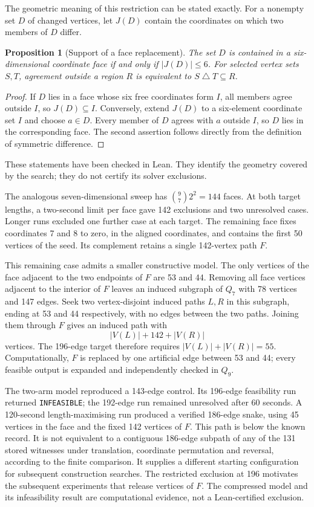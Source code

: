 \documentclass[11pt,a4paper]{article}
\newtheorem{proposition}[theorem]{Proposition}
\theoremstyle{definition}
\theoremstyle{remark}
\begin{document}
The geometric meaning of this restriction can be stated exactly. For a nonempty set $D$ of changed vertices, let $J(D)$ contain the coordinates on which two members of $D$ differ.
\begin{proposition}[Support of a face replacement]
The set $D$ is contained in a six-dimensional coordinate face if and only if $|J(D)|\le6$. For selected vertex sets $S,T$, agreement outside a region $R$ is equivalent to $S\mathbin{\triangle}T\subseteq R$.
\end{proposition}
\begin{proof}
If $D$ lies in a face whose six free coordinates form $I$, all members agree outside $I$, so $J(D)\subseteq I$. Conversely, extend $J(D)$ to a six-element coordinate set $I$ and choose $a\in D$. Every member of $D$ agrees with $a$ outside $I$, so $D$ lies in the corresponding face. The second assertion follows directly from the definition of symmetric difference.
\end{proof}
These statements have been checked in Lean. They identify the geometry covered by the search; they do not certify its solver exclusions.

The analogous seven-dimensional sweep has $\binom97 2^2=144$ faces. At both target lengths, a two-second limit per face gave 142 exclusions and two unresolved cases. Longer runs excluded one further case at each target. The remaining face fixes coordinates 7 and 8 to zero, in the aligned coordinates, and contains the first 50 vertices of the seed. Its complement retains a single 142-vertex path $F$.

This remaining case admits a smaller constructive model. The only vertices of the face adjacent to the two endpoints of $F$ are 53 and 44. Removing all face vertices adjacent to the interior of $F$ leaves an induced subgraph of $Q_7$ with 78 vertices and 147 edges. Seek two vertex-disjoint induced paths $L,R$ in this subgraph, ending at 53 and 44 respectively, with no edges between the two paths. Joining them through $F$ gives an induced path with
\[
|V(L)|+142+|V(R)|
\]
vertices. The 196-edge target therefore requires $|V(L)|+|V(R)|=55$. Computationally, $F$ is replaced by one artificial edge between 53 and 44; every feasible output is expanded and independently checked in $Q_9$.

The two-arm model reproduced a 143-edge control. Its 196-edge feasibility run returned \texttt{INFEASIBLE}; the 192-edge run remained unresolved after 60 seconds. A 120-second length-maximising run produced a verified 186-edge snake, using 45 vertices in the face and the fixed 142 vertices of $F$. This path is below the known record. It is not equivalent to a contiguous 186-edge subpath of any of the 131 stored witnesses under translation, coordinate permutation and reversal, according to the finite comparison. It supplies a different starting configuration for subsequent construction searches. The restricted exclusion at 196 motivates the subsequent experiments that release vertices of $F$. The compressed model and its infeasibility result are computational evidence, not a Lean-certified exclusion.
\end{document}
